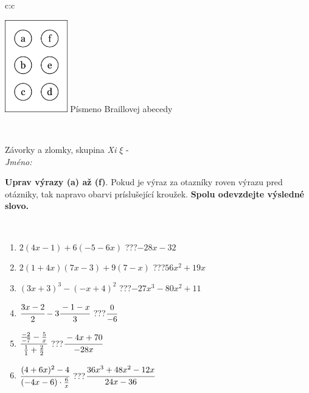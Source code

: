 \documentclass[10pt]{report}
\begin{document}
\begin{tabular}{c:c}
\begin{minipage}[c][104.5mm][t]{0.5\linewidth}
\begin{center}
\begin{minipage}{0.20\linewidth}
\begin{center}
\includegraphics[height=40mm]{../images/braille.png}
{\small Písmeno Braillovej abecedy}
\end{center}
\end{minipage}
\end{center}
\end{minipage}
\\ \hdashline
\begin{minipage}[c][104.5mm][t]{0.5\linewidth}
\begin{center}
\vspace{7mm}
{\huge Závorky a zlomky, skupina \textit{Xi $\xi$} -}\\[5mm]
\textit{Jméno:}\phantom{xxxxxxxxxxxxxxxxxxxxxxxxxxxxxxxxxxxxxxxxxxxxxxxxxxxxxxxxxxxxxxxxx}\\[5mm]
\begin{minipage}{0.95\linewidth}
\begin{center}
\textbf{Uprav výrazy (a) až (f)}. Pokud je výraz za otazníky roven výrazu pred otázniky, tak napravo obarvi príslušející kroužek. \textbf{Spolu odevzdejte výsledné slovo.}
\end{center}
\end{minipage}
\\[1mm]
\begin{minipage}{0.79\linewidth}
\begin{center}
\begin{varwidth}{\linewidth}
\begin{enumerate}
\normalsize
\item $2(4x-1)+6(-5-6x)$\quad \dotfill\; ???\;\dotfill \quad $-28x-32$
\item $2(1+4x)(7x-3)+9(7-x)$\quad \dotfill\; ???\;\dotfill \quad $56x^2+19x$
\item $(3x+3)^3-(-x+4)^2$\quad \dotfill\; ???\;\dotfill \quad $-27x^3-80x^2+11$
\item $\cfrac{3x-2}{2}-3\cfrac{-1-x}{3}$\quad \dotfill\; ???\;\dotfill \quad $\cfrac{0}{-6}$
\item $\cfrac{\frac{-2}{-7}-\frac{5}{x}}{\frac{1}{1}+\frac{2}{2}}$\quad \dotfill\; ???\;\dotfill \quad $\cfrac{-4x+70}{-28x}$
\item $\cfrac{(4+6x)^2-4}{(-4x-6)\cdot\frac{6}{x}}$\quad \dotfill\; ???\;\dotfill \quad $\cfrac{36x^3+48x^2-12x}{24x-36}$

\end{enumerate}
\end{varwidth}
\end{center}
\end{minipage}
\end{center}
\end{minipage}
\end{tabular}
\end{document}
